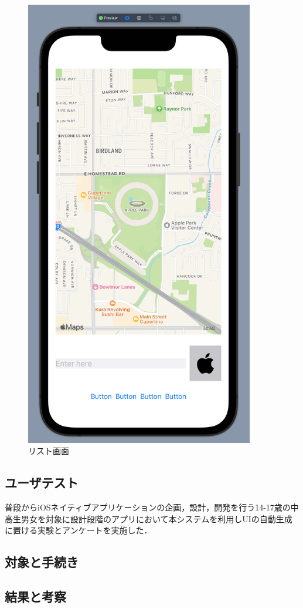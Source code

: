 \begin{figure}[htbp]
  \begin{minipage}{\hsize}
    \begin{center}
       \includegraphics[width=100mm]{img/Maps_autogen.png}
    \end{center}
    \caption{リスト画面}
    \label{fig:Maps_autogen}
  \end{minipage}
\end{figure}


\subsection{ユーザテスト}
普段からiOSネイティブアプリケーションの企画，設計，開発を行う14-17歳の中高生男女を対象に設計段階のアプリにおいて本システムを利用しUIの自動生成に置ける実験とアンケートを実施した．

\subsection{対象と手続き}

\subsection{結果と考察}